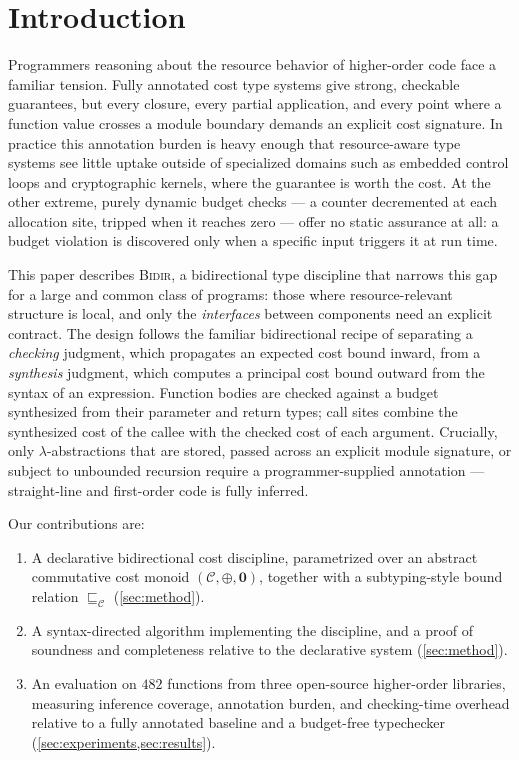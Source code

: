 \section{Introduction}
\label{sec:intro}

Programmers reasoning about the resource behavior of higher-order code
face a familiar tension. Fully annotated cost type systems give strong,
checkable guarantees, but every closure, every partial application, and
every point where a function value crosses a module boundary demands an
explicit cost signature. In practice this annotation burden is heavy
enough that resource-aware type systems see little uptake outside of
specialized domains such as embedded control loops and cryptographic
kernels, where the guarantee is worth the cost. At the other extreme,
purely dynamic budget checks --- a counter decremented at each allocation
site, tripped when it reaches zero --- offer no static assurance at all:
a budget violation is discovered only when a specific input triggers it
at run time.

This paper describes \textsc{Bidir}, a bidirectional type discipline that
narrows this gap for a large and common class of programs: those where
resource-relevant structure is local, and only the \emph{interfaces}
between components need an explicit contract. The design follows the
familiar bidirectional recipe of separating a \emph{checking} judgment,
which propagates an expected cost bound inward, from a
\emph{synthesis} judgment, which computes a principal cost bound outward
from the syntax of an expression. Function bodies are checked against a
budget synthesized from their parameter and return types; call sites
combine the synthesized cost of the callee with the checked cost of each
argument. Crucially, only $\lambda$-abstractions that are stored, passed
across an explicit module signature, or subject to unbounded recursion
require a programmer-supplied annotation --- straight-line and
first-order code is fully inferred.

Our contributions are:
\begin{enumerate}
  \item A declarative bidirectional cost discipline, parametrized over an
    abstract commutative cost monoid $(\mathcal{C}, \oplus, \mathbf{0})$,
    together with a subtyping-style bound relation $\sqsubseteq_{\mathcal{C}}$
    (\cref{sec:method}).
  \item A syntax-directed algorithm implementing the discipline, and a
    proof of soundness and completeness relative to the declarative
    system (\cref{sec:method}).
  \item An evaluation on $482$ functions from three open-source
    higher-order libraries, measuring inference coverage, annotation
    burden, and checking-time overhead relative to a fully annotated
    baseline and a budget-free typechecker (\cref{sec:experiments,sec:results}).
\end{enumerate}
